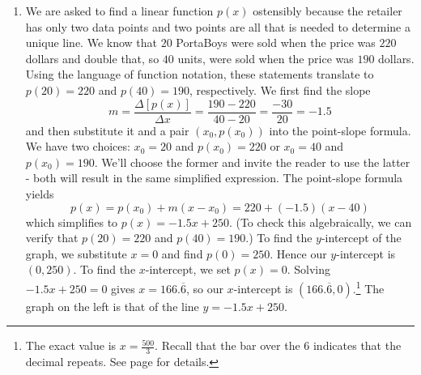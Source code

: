 \documentclass{ximera}
\begin{document}
\begin{example}
\begin{explanation}
\begin{enumerate}
\item  We are asked to find a linear function $p(x)$ ostensibly because the retailer has only two data points and two points are all that is needed to determine a unique line.  We know that $20$ PortaBoys were sold  when the price was $220$ dollars and double that, so $40$ units, were sold when the price was $190$ dollars. Using the language of function notation, these statements translate to  $p(20)=220$ and $p(40)=190$, respectively.  We first find the slope \[ m = \frac{\Delta [p(x)]}{\Delta x} = \frac{190 - 220}{40 - 20} = \frac{-30}{20} = -1.5\] and then substitute it and a pair $(x_0, p(x_0))$ into the point-slope formula.  We have two choices:  $x_0 = 20$ and $p(x_0) = 220$ or $x_0 = 40$ and $p(x_0) = 190$.  We'll choose the former and invite the reader to use the latter - both will result in the same simplified expression.  The point-slope formula yields  \[p(x) = p(x_0) + m (x - x_0) = 220 + (-1.5)(x - 40)\] which simplifies to $p(x) = -1.5x + 250$.  (To check this algebraically, we can verify that $p(20) = 220$ and $p(40) = 190$.) To find the $y$-intercept of the graph, we substitute $x = 0$ and find $p(0) = 250$.  Hence our $y$-intercept is $(0, 250)$.  To find the $x$-intercept, we set $p(x) = 0$. Solving $-1.5x + 250 = 0$ gives $x = 166.\overline{6}$, so our $x$-intercept is $(166.\overline{6}, 0)$.\footnote{The exact value is $x = \frac{500}{3}$. Recall that the bar over the $6$ indicates that the decimal repeats.  See page \pageref{repeatingdecimalnote} for details.} The graph on the left is that of the line $y = -1.5x + 250$.  


\begin{center}

\end{center}
\end{enumerate}
\end{explanation}
\end{example}
\end{document}
